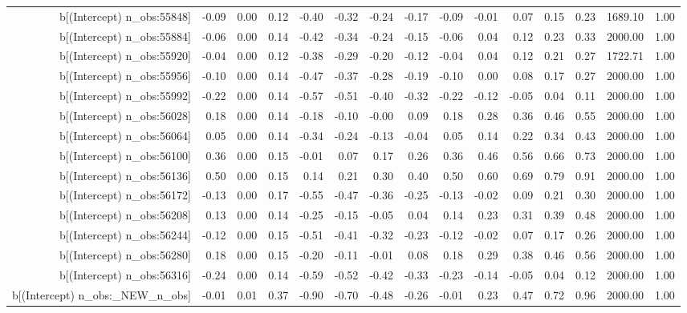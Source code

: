 \begin{table}[ht]
\begin{tabular}{rrrrrrrrrrrrrrr}
  b[(Intercept) n\_obs:55848] & -0.09 & 0.00 & 0.12 & -0.40 & -0.32 & -0.24 & -0.17 & -0.09 & -0.01 & 0.07 & 0.15 & 0.23 & 1689.10 & 1.00 \\ 
  b[(Intercept) n\_obs:55884] & -0.06 & 0.00 & 0.14 & -0.42 & -0.34 & -0.24 & -0.15 & -0.06 & 0.04 & 0.12 & 0.23 & 0.33 & 2000.00 & 1.00 \\ 
  b[(Intercept) n\_obs:55920] & -0.04 & 0.00 & 0.12 & -0.38 & -0.29 & -0.20 & -0.12 & -0.04 & 0.04 & 0.12 & 0.21 & 0.27 & 1722.71 & 1.00 \\ 
  b[(Intercept) n\_obs:55956] & -0.10 & 0.00 & 0.14 & -0.47 & -0.37 & -0.28 & -0.19 & -0.10 & 0.00 & 0.08 & 0.17 & 0.27 & 2000.00 & 1.00 \\ 
  b[(Intercept) n\_obs:55992] & -0.22 & 0.00 & 0.14 & -0.57 & -0.51 & -0.40 & -0.32 & -0.22 & -0.12 & -0.05 & 0.04 & 0.11 & 2000.00 & 1.00 \\ 
  b[(Intercept) n\_obs:56028] & 0.18 & 0.00 & 0.14 & -0.18 & -0.10 & -0.00 & 0.09 & 0.18 & 0.28 & 0.36 & 0.46 & 0.55 & 2000.00 & 1.00 \\ 
  b[(Intercept) n\_obs:56064] & 0.05 & 0.00 & 0.14 & -0.34 & -0.24 & -0.13 & -0.04 & 0.05 & 0.14 & 0.22 & 0.34 & 0.43 & 2000.00 & 1.00 \\ 
  b[(Intercept) n\_obs:56100] & 0.36 & 0.00 & 0.15 & -0.01 & 0.07 & 0.17 & 0.26 & 0.36 & 0.46 & 0.56 & 0.66 & 0.73 & 2000.00 & 1.00 \\ 
  b[(Intercept) n\_obs:56136] & 0.50 & 0.00 & 0.15 & 0.14 & 0.21 & 0.30 & 0.40 & 0.50 & 0.60 & 0.69 & 0.79 & 0.91 & 2000.00 & 1.00 \\ 
  b[(Intercept) n\_obs:56172] & -0.13 & 0.00 & 0.17 & -0.55 & -0.47 & -0.36 & -0.25 & -0.13 & -0.02 & 0.09 & 0.21 & 0.30 & 2000.00 & 1.00 \\ 
  b[(Intercept) n\_obs:56208] & 0.13 & 0.00 & 0.14 & -0.25 & -0.15 & -0.05 & 0.04 & 0.14 & 0.23 & 0.31 & 0.39 & 0.48 & 2000.00 & 1.00 \\ 
  b[(Intercept) n\_obs:56244] & -0.12 & 0.00 & 0.15 & -0.51 & -0.41 & -0.32 & -0.23 & -0.12 & -0.02 & 0.07 & 0.17 & 0.26 & 2000.00 & 1.00 \\ 
  b[(Intercept) n\_obs:56280] & 0.18 & 0.00 & 0.15 & -0.20 & -0.11 & -0.01 & 0.08 & 0.18 & 0.29 & 0.38 & 0.46 & 0.56 & 2000.00 & 1.00 \\ 
  b[(Intercept) n\_obs:56316] & -0.24 & 0.00 & 0.14 & -0.59 & -0.52 & -0.42 & -0.33 & -0.23 & -0.14 & -0.05 & 0.04 & 0.12 & 2000.00 & 1.00 \\ 
  b[(Intercept) n\_obs:\_NEW\_n\_obs] & -0.01 & 0.01 & 0.37 & -0.90 & -0.70 & -0.48 & -0.26 & -0.01 & 0.23 & 0.47 & 0.72 & 0.96 & 2000.00 & 1.00 \\ 

\end{tabular}
\end{table}
